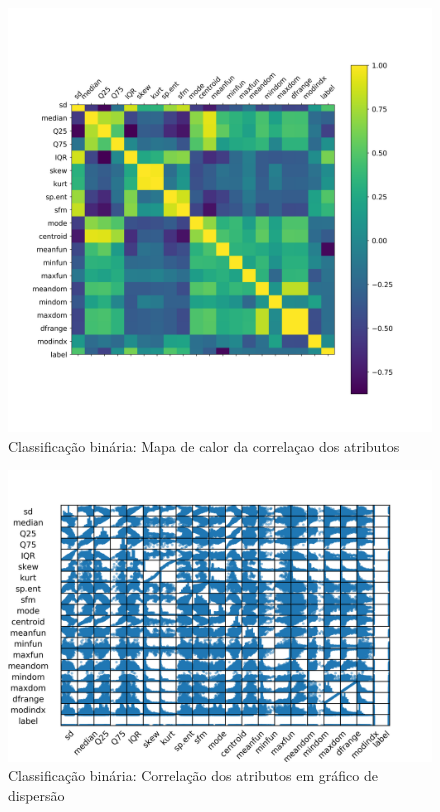 \documentclass{article}
\begin{document}
        \begin{figure}[H]
            \centering
            \includegraphics[width=.8\linewidth]{img1/data_corr.png}
            \caption{Classificação binária: Mapa de calor da correlaçao dos atributos}
            \label{fig:a_corr_heat}
        \end{figure}
        \begin{figure}[H]
            \centering
            \includegraphics[width=\textwidth]{img1/data_corr_scatter.png}
            \caption{Classificação binária: Correlação dos atributos em gráfico de dispersão }
            \label{fig:a_corr_scatter}
        \end{figure}
\end{document}
